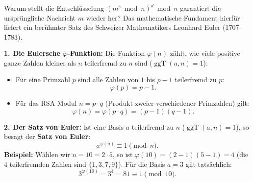 \begin{myexcursion}\label{exc:rsa-beweis}\label{exc:euler}
	Warum stellt die Entschlüsselung $(m^e \bmod n)^d \bmod n$ garantiert die ursprüngliche Nachricht $m$ wieder her? Das mathematische Fundament hierfür liefert ein berühmter Satz des Schweizer Mathematikers Leonhard Euler (1707--1783).

	\textbf{1. Die Eulersche $\varphi$-Funktion:}
	Die Funktion $\varphi(n)$ zählt, wie viele positive ganze Zahlen kleiner als $n$ teilerfremd zu $n$ sind ($\operatorname{ggT}(a, n) = 1$):
	\begin{itemize}
		\item Für eine Primzahl $p$ sind alle Zahlen von $1$ bis $p-1$ teilerfremd zu $p$:
		      \[
			      \varphi(p) = p - 1.
		      \]
		\item Für das \gls{RSA}-Modul $n = p \cdot q$ (Produkt zweier verschiedener Primzahlen) gilt:
		      \[
			      \varphi(n) = \varphi(p \cdot q) = (p - 1)(q - 1).
		      \]
	\end{itemize}

	\textbf{2. Der Satz von Euler:}
	Ist eine Basis $a$ teilerfremd zu $n$ ($\operatorname{ggT}(a, n) = 1$), so besagt der \textbf{Satz von Euler}:
	\[
		a^{\varphi(n)} \equiv 1 \pmod n.
	\]
	\textbf{Beispiel:} Wählen wir $n = 10 = 2 \cdot 5$, so ist $\varphi(10) = (2-1)(5-1) = 4$ (die $4$ teilerfremden Zahlen sind $\{1, 3, 7, 9\}$). Für die Basis $a = 3$ gilt tatsächlich:
	\[
		3^{\varphi(10)} = 3^4 = 81 \equiv 1 \pmod{10}.
	\]


\end{myexcursion}
